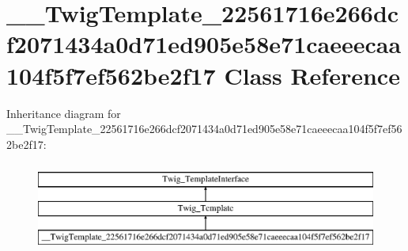 \hypertarget{class_____twig_template__22561716e266dcf2071434a0d71ed905e58e71caeeecaa104f5f7ef562be2f17}{}\section{\+\_\+\+\_\+\+Twig\+Template\+\_\+22561716e266dcf2071434a0d71ed905e58e71caeeecaa104f5f7ef562be2f17 Class Reference}
\label{class_____twig_template__22561716e266dcf2071434a0d71ed905e58e71caeeecaa104f5f7ef562be2f17}
Inheritance diagram for \+\_\+\+\_\+\+Twig\+Template\+\_\+22561716e266dcf2071434a0d71ed905e58e71caeeecaa104f5f7ef562be2f17\+:\begin{figure}[H]
\begin{center}
\leavevmode
\includegraphics[height=3.000000cm]{class_____twig_template__22561716e266dcf2071434a0d71ed905e58e71caeeecaa104f5f7ef562be2f17}
\end{center}
\end{figure}
